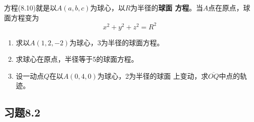 方程(8.10)就是以$A(a,b,c)$为球心，以$R$为半径的\textbf{球面
方程}。当$A$点在原点，球面方程变为
\[    x^2+y^2+z^2=R^2\]



\begin{ex}
\begin{enumerate}
    \item 求以$A(1,2,-2)$为球心，3为半径的球面方程。
    \item 求球心在原点，半径等于5的球面方程。
    \item 设一动点$Q$在以$A(0,4,0)$为球心，2为半径的球面
    上变动，求$\overline{OQ}$中点的轨迹。
\end{enumerate}
\end{ex}

\subsection*{习题8.2}
